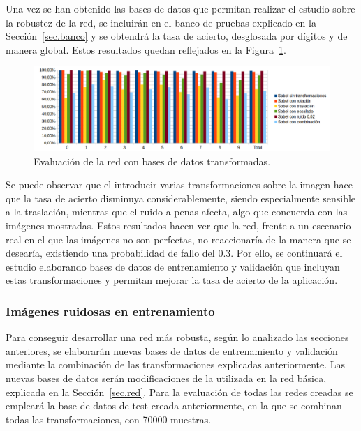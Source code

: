 Una vez se han obtenido las bases de datos que permitan realizar el estudio sobre la robustez de la red, se incluirán en el banco de pruebas explicado en la Sección~\ref{sec.banco} y se obtendrá la tasa de acierto, desglosada por dígitos y de manera global. Estos resultados quedan reflejados en la Figura~\ref{fig.sobelEval}.

\begin{figure}[H]
	\begin{center}
		\includegraphics[width=1\textwidth]{figures/sobelev}
		\caption{Evaluación de la red con bases de datos transformadas.}
		\label{fig.sobelEval}
	\end{center}
\end{figure}

Se puede observar que el introducir varias transformaciones sobre la imagen hace que la tasa de acierto disminuya considerablemente, siendo especialmente sensible a la traslación, mientras que el ruido a penas afecta, algo que concuerda con las imágenes mostradas. Estos resultados hacen ver que la red, frente a un escenario real en el que las imágenes no son perfectas, no reaccionaría de la manera que se desearía, existiendo una probabilidad de fallo del 0.3. Por ello, se continuará el estudio elaborando bases de datos de entrenamiento y validación que incluyan estas transformaciones y permitan mejorar la tasa de acierto de la aplicación.

\subsubsection{Imágenes ruidosas en entrenamiento}
Para conseguir desarrollar una red más robusta, según lo analizado las secciones anteriores, se elaborarán nuevas bases de datos de entrenamiento y validación mediante la combinación de las transformaciones explicadas anteriormente. Las nuevas bases de datos serán modificaciones de la utilizada en la red básica, explicada en la Sección~\ref{sec.red}. Para la evaluación de todas las redes creadas se empleará la base de datos de test creada anteriormente, en la que se combinan todas las transformaciones, con 70000 muestras.\\

